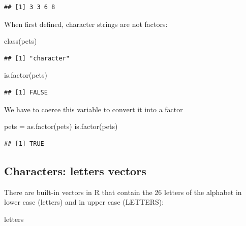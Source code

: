 \documentclass[
]{book}
\newenvironment{Shaded}{\begin{snugshade}}{\end{snugshade}}
\newcommand{\FunctionTok}[1]{\textcolor[rgb]{0.00,0.00,0.00}{#1}}
\newcommand{\NormalTok}[1]{#1}
\newcommand{\OtherTok}[1]{\textcolor[rgb]{0.56,0.35,0.01}{#1}}
\theoremstyle{definition}
\theoremstyle{definition}
\theoremstyle{definition}
\theoremstyle{definition}
\theoremstyle{remark}
\begin{document}
\begin{verbatim}
## [1] 3 3 6 8
\end{verbatim}

When first defined, character strings are not factors:

\begin{Shaded}
\begin{Highlighting}[]
\FunctionTok{class}\NormalTok{(pets)}
\end{Highlighting}
\end{Shaded}

\begin{verbatim}
## [1] "character"
\end{verbatim}

\begin{Shaded}
\begin{Highlighting}[]
\FunctionTok{is.factor}\NormalTok{(pets)}
\end{Highlighting}
\end{Shaded}

\begin{verbatim}
## [1] FALSE
\end{verbatim}

We have to coerce this variable to convert it into a factor

\begin{Shaded}
\begin{Highlighting}[]
\NormalTok{pets }\OtherTok{=} \FunctionTok{as.factor}\NormalTok{(pets)}
\FunctionTok{is.factor}\NormalTok{(pets)}
\end{Highlighting}
\end{Shaded}

\begin{verbatim}
## [1] TRUE
\end{verbatim}

\hypertarget{characters-letters-vectors}{%
\subsection{Characters: letters vectors}\label{characters-letters-vectors}}

There are built-in vectors in R that contain the 26 letters of the alphabet in lower case (letters) and in upper
case (LETTERS):

\begin{Shaded}
\begin{Highlighting}[]
\NormalTok{letters}
\end{Highlighting}
\end{Shaded}
\end{document}
